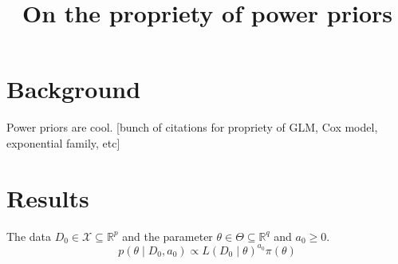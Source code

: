 \documentclass[a4paper, notitlepage, 11pt]{article}
\title{\vspace{-9ex}\centering \bf On the propriety of power priors}
\author{
}
\begin{document}
\maketitle

% 

\section*{Background}

Power priors are cool. [bunch of citations for propriety of GLM, Cox model, exponential family, etc]

\section*{Results}

The data $D_0 \in \mathcal{X} \subseteq \mathbb{R}^p$  and the parameter $\theta \in \Theta \subseteq \mathbb{R}^q$ and $a_0 \geq 0$.
\begin{equation}
\label{eq:power_prior}
 p(\theta \mid D_0, a_0) \propto L(D_0 \mid \theta)^{a_0}\pi(\theta)
\end{equation}
\end{document}
